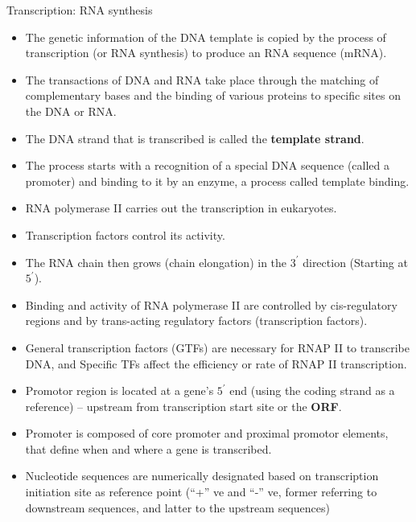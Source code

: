 \documentclass[11pt,ignorenonframetext,aspectratio=169]{beamer}
\providecommand{\tightlist}{%
  \setlength{\itemsep}{0pt}\setlength{\parskip}{0pt}}
\begin{document}
\begin{frame}{Transcription: RNA synthesis}
\protect\hypertarget{transcription-rna-synthesis}{}

\begin{itemize}
\tightlist
\item
  The genetic information of the DNA template is copied by the process
  of transcription (or RNA synthesis) to produce an RNA sequence (mRNA).
\item
  The transactions of DNA and RNA take place through the matching of
  complementary bases and the binding of various proteins to specific
  sites on the DNA or RNA.
\item
  The DNA strand that is transcribed is called the \textbf{template
  strand}.
\item
  The process starts with a recognition of a special DNA sequence
  (called a promoter) and binding to it by an enzyme, a process called
  template binding.
\item
  RNA polymerase II carries out the transcription in eukaryotes.
\item
  Transcription factors control its activity.
\item
  The RNA chain then grows (chain elongation) in the \(3^\prime\)
  direction (Starting at \(5^\prime\)).
\end{itemize}

\end{frame}

\begin{frame}{}
\protect\hypertarget{section-15}{}

\begin{itemize}
\tightlist
\item
  Binding and activity of RNA polymerase II are controlled by
  cis-regulatory regions and by trans-acting regulatory factors
  (transcription factors).
\item
  General transcription factors (GTFs) are necessary for RNAP II to
  transcribe DNA, and Specific TFs affect the efficiency or rate of RNAP
  II transcription.
\item
  Promotor region is located at a gene's \(5^\prime\) end (using the
  coding strand as a reference) -- upstream from transcription start
  site or the \textbf{ORF}.
\item
  Promoter is composed of core promoter and proximal promotor elements,
  that define when and where a gene is transcribed.
\item
  Nucleotide sequences are numerically designated based on transcription
  initiation site as reference point (``+'' ve and ``-'' ve, former
  referring to downstream sequences, and latter to the upstream
  sequences)
\end{itemize}

\end{frame}
\end{document}
